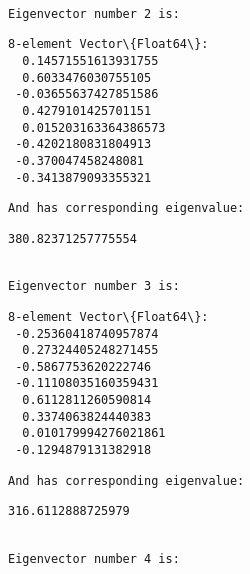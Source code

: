 \documentclass[11pt]{article}
\begin{document}
    
    \begin{Verbatim}[commandchars=\\\{\}]

Eigenvector number 2 is:
    \end{Verbatim}

    
    \begin{Verbatim}[commandchars=\\\{\}]
8-element Vector\{Float64\}:
  0.14571551613931755
  0.6033476030755105
 -0.03655637427851586
  0.4279101425701151
  0.015203163364386573
 -0.4202180831804913
 -0.370047458248081
 -0.3413879093355321
    \end{Verbatim}

    
    \begin{Verbatim}[commandchars=\\\{\}]
And has corresponding eigenvalue:
    \end{Verbatim}

    
    \begin{Verbatim}[commandchars=\\\{\}]
380.82371257775554
    \end{Verbatim}

    
    \begin{Verbatim}[commandchars=\\\{\}]

Eigenvector number 3 is:
    \end{Verbatim}

    
    \begin{Verbatim}[commandchars=\\\{\}]
8-element Vector\{Float64\}:
 -0.25360418740957874
  0.27324405248271455
 -0.5867753620222746
 -0.11108035160359431
  0.6112811260590814
  0.3374063824440383
  0.010179994276021861
 -0.1294879131382918
    \end{Verbatim}

    
    \begin{Verbatim}[commandchars=\\\{\}]
And has corresponding eigenvalue:
    \end{Verbatim}

    
    \begin{Verbatim}[commandchars=\\\{\}]
316.6112888725979
    \end{Verbatim}

    
    \begin{Verbatim}[commandchars=\\\{\}]

Eigenvector number 4 is:
    \end{Verbatim}
\end{document}
